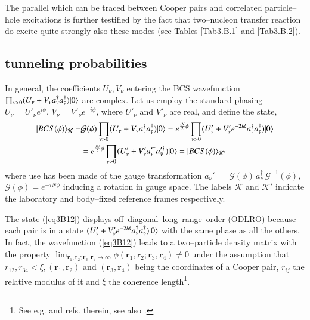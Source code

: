 \begin{subappendices}
    
 The parallel which can be traced between Cooper pairs and correlated particle--hole excitations is further testified by the fact that two--nucleon transfer reaction do excite quite strongly also these modes (see Tables \ref{Tab3.B.1} and \ref{Tab3.B.2}). 

 \subsection{tunneling probabilities}
 In general, the coefficients $U_\nu,V_\nu$ entering the BCS wavefunction $\prod_{\nu>0}(U_\nu+V_\nu a_\nu^\dagger a_{\bar{\nu}}^\dagger)|{0} \rangle$ are complex. Let us employ the standard phasing $U_\nu=U'_\nu e^{i\phi}$, $V_\nu=V'_\nu e^{-i\phi}$, where $U'_\nu$ and $V'_\nu$ are real, and define the state,
 \begin{align}\label{eq3B12}
\nonumber |{BCS(\phi)} \rangle_{\mathcal K}=&\mathcal G(\phi) \prod_{\nu>0}(U_\nu+V_\nu a_\nu^\dagger a_{\bar{\nu}}^\dagger)|{0} \rangle=e^{\frac{iN}{2}\phi}\prod_{\nu>0}(U'_\nu+V'_\nu e^{-2i\phi} a_\nu^\dagger a_{\bar{\nu}}^\dagger)|{0} \rangle\\
&=e^{\frac{iN}{2}\phi}\prod_{\nu>0}(U'_\nu+V'_\nu  a_\nu'^\dagger a_{\bar{\nu}}'^\dagger)|{0} \rangle=|{BCS(\phi)} \rangle_{\mathcal K'}
 \end{align}  
 where use has been made of the gauge transformation $a_\nu'^\dagger=\mathcal G(\phi)\,a_\nu^\dagger\,\mathcal G^{-1}(\phi)$, $\mathcal G(\phi)=e^{-iN\phi}$ inducing a rotation in gauge space. The labels $\mathcal K$ and $\mathcal K'$ indicate the laboratory and body--fixed reference frames respectively.
 
 
 The state (\ref{eq3B12}) displays off--diagonal--long--range--order (ODLRO) because each pair is in a state $(U'_\nu+V'_\nu e^{-2i\phi} a_\nu^\dagger a_{\bar{\nu}}^\dagger)|{0} \rangle$ with the same phase as all the others. In fact, the wavefunction (\ref{eq3B12}) leads to a two--particle density matrix with the property $\lim_{\mathbf r_1, \mathbf r_2;\mathbf r_3, \mathbf r_4\rightarrow\infty}\phi(\mathbf r_1, \mathbf r_2;\mathbf r_3, \mathbf r_4)\neq 0$ under the assumption that $r_{12}, r_{34}<\xi, (\mathbf r_1, \mathbf r_2)$ and $(\mathbf r_3, \mathbf r_4)$ being the coordinates of a Cooper pair, $r_{ij}$ the relative modulus of it and $\xi$ the coherence length\footnote{See e.g. \cite{Ambegaokar:69} and refs. therein, see also \cite{Potel:17}.}.
 

\end{subappendices}
